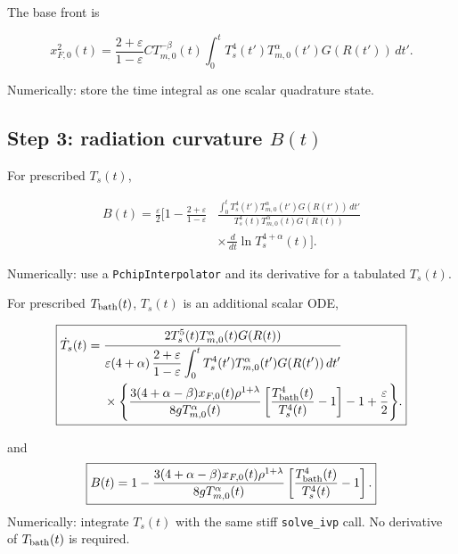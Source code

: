 \documentclass[11pt]{article}
\numberwithin{equation}{section}
\newcommand{\Ts}{T_s}
\newcommand{\Tb}{T_{\rm bath}}
\newcommand{\Tm}{T_{m,0}}
\newcommand{\xfzero}{x_{F,0}}
\newcommand{\eps}{\varepsilon}
\newcommand{\dif}{\,d}
\begin{document}
The base front is
\begin{resultbox}
\begin{equation}
 \boxed{
 \xfzero^2(t)
 =\frac{2+\eps}{1-\eps}C\Tm^{-\beta}(t)
 \int_0^t\Ts^4(t')\Tm^\alpha(t')G(R(t'))\dif t'.}
 \label{eq:sum_xf0}
\end{equation}
\end{resultbox}
Numerically: store the time integral as one scalar quadrature state.

\subsection*{Step 3: radiation curvature $B(t)$}

For prescribed $\Ts(t)$,
\begin{resultbox}
\begin{equation}
 \boxed{
 \begin{aligned}
 B(t)=\frac{\eps}{2}\Bigg[1
 -\frac{2+\eps}{1-\eps}
 &\frac{\displaystyle\int_0^t
 \Ts^4(t')\Tm^\alpha(t')G(R(t'))\dif t'}
 {\Ts^4(t)\Tm^\alpha(t)G(R(t))}
 \\
 &\times\frac{\dif}{\dif t}\ln\Ts^{4+\alpha}(t)
 \Bigg].
 \end{aligned}}
 \label{eq:sum_B_Ts}
\end{equation}
\end{resultbox}
Numerically: use a \texttt{PchipInterpolator} and its derivative for a
tabulated $\Ts(t)$.

For prescribed $\Tb(t)$, $\Ts(t)$ is an additional scalar ODE,
\begin{resultbox}
\begin{equation}
 \boxed{
 \begin{aligned}
 \dot\Ts(t)
 ={}&\frac{2\Ts^5(t)\Tm^\alpha(t)G(R(t))}
 {\eps(4+\alpha)\,\dfrac{2+\eps}{1-\eps}
 \displaystyle\int_0^t\Ts^4(t')\Tm^\alpha(t')G(R(t'))\dif t'}
 \\
 &\times\Bigg\{
 \frac{3(4+\alpha-\beta)\xfzero(t)\rho^{1+\lambda}}
 {8g\Tm^\alpha(t)}
 \left[\frac{\Tb^4(t)}{\Ts^4(t)}-1\right]
 -1+\frac{\eps}{2}\Bigg\}.
 \end{aligned}}
 \label{eq:sum_Ts_bath_ode}
\end{equation}
\end{resultbox}
and
\begin{equation}
 \boxed{
 B(t)=1-
 \frac{3(4+\alpha-\beta)\xfzero(t)\rho^{1+\lambda}}
 {8g\Tm^\alpha(t)}
 \left[\frac{\Tb^4(t)}{\Ts^4(t)}-1\right].}
 \label{eq:sum_B_bath}
\end{equation}
Numerically: integrate $\Ts(t)$ with the same stiff \texttt{solve\_ivp}
call.  No derivative of $\Tb(t)$ is required.
\end{document}
